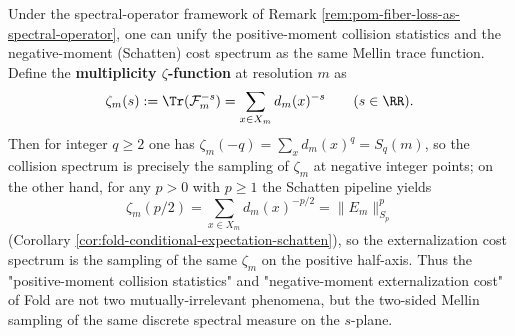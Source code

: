 \begin{remark}\label{rem:pom-multiplicity-zeta-mellin-body}
Under the spectral-operator framework of Remark \ref{rem:pom-fiber-loss-as-spectral-operator}, one can unify the positive-moment collision statistics and the negative-moment (Schatten) cost spectrum as the same Mellin trace function.
Define the \textbf{multiplicity \(\zeta\)-function} at resolution \(m\) as
\[
\zeta_m(s):=\Tr(\mathcal{F}_m^{-s})=\sum_{x\in X_m} d_m(x)^{-s}\qquad(s\in\RR).
\]
Then for integer \(q\ge 2\) one has \(\zeta_m(-q)=\sum_x d_m(x)^q=S_q(m)\), so the collision spectrum is precisely the sampling of \(\zeta_m\) at negative integer points;
on the other hand, for any \(p>0\) with \(p\ge 1\) the Schatten pipeline yields
\[
\zeta_m(p/2)=\sum_{x\in X_m}d_m(x)^{-p/2}=\|E_m\|_{S_p}^{p}
\]
(Corollary \ref{cor:fold-conditional-expectation-schatten}), so the externalization cost spectrum is the sampling of the same \(\zeta_m\) on the positive half-axis.
Thus the "positive-moment collision statistics" and "negative-moment externalization cost" of Fold are not two mutually-irrelevant phenomena, but the two-sided Mellin sampling of the same discrete spectral measure on the \(s\)-plane.
\end{remark}

